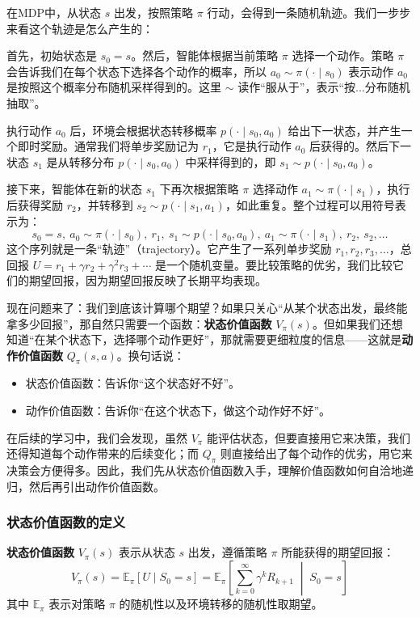 \documentclass[lang=cn,zihao=-4,a4paper,fontset=windows]{beautybook}
\begin{document}
在MDP中，从状态 $s$ 出发，按照策略 $\pi$ 行动，会得到一条随机轨迹。我们一步步来看这个轨迹是怎么产生的：

首先，初始状态是 $s_0 = s$。然后，智能体根据当前策略 $\pi$ 选择一个动作。策略 $\pi$ 会告诉我们在每个状态下选择各个动作的概率，所以 $a_0 \sim \pi(\cdot \mid s_0)$ 表示动作 $a_0$ 是按照这个概率分布随机采样得到的。这里 $\sim$ 读作“服从于”，表示“按...分布随机抽取”。

执行动作 $a_0$ 后，环境会根据状态转移概率 $p(\cdot \mid s_0, a_0)$ 给出下一状态，并产生一个即时奖励。通常我们将单步奖励记为 $r_1$，它是执行动作 $a_0$ 后获得的。然后下一状态 $s_1$ 是从转移分布 $p(\cdot \mid s_0, a_0)$ 中采样得到的，即 $s_1 \sim p(\cdot \mid s_0, a_0)$。

接下来，智能体在新的状态 $s_1$ 下再次根据策略 $\pi$ 选择动作 $a_1 \sim \pi(\cdot \mid s_1)$，执行后获得奖励 $r_2$，并转移到 $s_2 \sim p(\cdot \mid s_1, a_1)$，如此重复。整个过程可以用符号表示为：
\[
s_0 = s,\ a_0\sim\pi(\cdot\mid s_0),\ r_1,\ s_1\sim p(\cdot\mid s_0,a_0),\ a_1\sim\pi(\cdot\mid s_1),\ r_2,\ s_2,\dots
\]
这个序列就是一条“轨迹”（trajectory）。它产生了一系列单步奖励 $r_1,r_2,r_3,\dots$，总回报 $U = r_1 + \gamma r_2 + \gamma^2 r_3 + \cdots$ 是一个随机变量。要比较策略的优劣，我们比较它们的期望回报，因为期望回报反映了长期平均表现。

现在问题来了：我们到底该计算哪个期望？如果只关心“从某个状态出发，最终能拿多少回报”，那自然只需要一个函数：\textbf{状态价值函数} $V_\pi(s)$。但如果我们还想知道“在某个状态下，选择哪个动作更好”，那就需要更细粒度的信息——这就是\textbf{动作价值函数} $Q_\pi(s,a)$。换句话说：
\begin{itemize}
    \item 状态价值函数：告诉你“这个状态好不好”。
    \item 动作价值函数：告诉你“在这个状态下，做这个动作好不好”。
\end{itemize}
在后续的学习中，我们会发现，虽然 $V_\pi$ 能评估状态，但要直接用它来决策，我们还得知道每个动作带来的后续变化；而 $Q_\pi$ 则直接给出了每个动作的优劣，用它来决策会方便得多。因此，我们先从状态价值函数入手，理解价值函数如何自洽地递归，然后再引出动作价值函数。

\subsubsection{状态价值函数的定义}

\textbf{状态价值函数} $V_\pi(s)$ 表示从状态 $s$ 出发，遵循策略 $\pi$ 所能获得的期望回报：
\[
V_\pi(s) = \mathbb{E}_\pi\left[ U \mid S_0 = s \right]
= \mathbb{E}_\pi\left[ \sum_{k=0}^{\infty} \gamma^k R_{k+1} \;\middle|\; S_0 = s \right]
\]
其中 $\mathbb{E}_\pi$ 表示对策略 $\pi$ 的随机性以及环境转移的随机性取期望。
\end{document}
